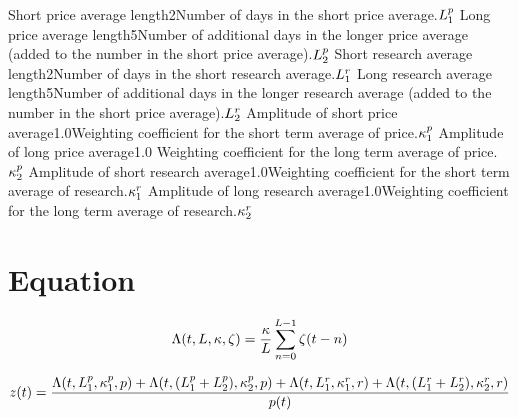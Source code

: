 \documentclass{article}
\begin{document}
\logo
{}
{Short price average length}{2}{Number of days in the short price
average.}{$L_{1}^{p}$}
{Long price average length}{5}{Number of additional days in the longer price average (added to the number in the short price average).}{$L_{2}^{p}$}
{Short research average length}{2}{Number of days in the short research average.}{$L_{1}^{r}$}
{Long research average length}{5}{Number of additional days in the longer research average (added to the number in the short price average).}{$L_{2}^{r}$}
{Amplitude of short price average}{1.0}{Weighting coefficient for the short term average of price.}{$\kappa_{1}^{p}$}
{Amplitude of long price average}{1.0}{ Weighting coefficient for the long term average of price.}{$\kappa_{2}^{p}$}
{Amplitude of short research average}{1.0}{Weighting coefficient for the short term average of research.}{$\kappa_{1}^{r}$}
{Amplitude of long research average}{1.0}{Weighting coefficient for the long term average of research.}{$\kappa_{2}^{r}$}
\stoptable

\section{Equation}

\begin{equation}
\Lambda(t, L, \kappa, \zeta) = \frac{\kappa}{L} \sum_{n=0}^{L-1} \zeta(t - n)\\
\label{eq1}
\end{equation}

\begin{equation}
z(t) = \frac{\Lambda(t, L_{1}^{p}, \kappa_{1}^{p}, p)+\Lambda(t, (L_{1}^{p} + L_{2}^{p}), \kappa_{2}^{p},p)+\Lambda(t, L_{1}^{r}, \kappa_{1}^{r}, r)+\Lambda(t, (L_{1}^{r} + L_{2}^{r}), \kappa_{2}^{r}, r)}{p(t)} \\
\label{eq2}
\end{equation}
\end{document}

